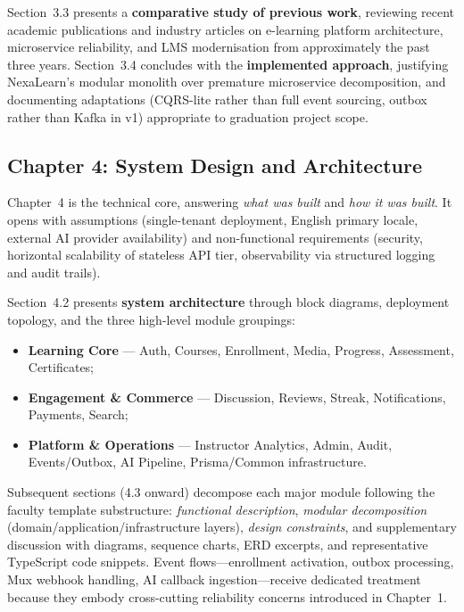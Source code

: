Section~3.3 presents a \textbf{comparative study of previous work}, reviewing recent academic publications and industry articles on e-learning platform architecture, microservice reliability, and LMS modernisation from approximately the past three years. Section~3.4 concludes with the \textbf{implemented approach}, justifying NexaLearn's modular monolith over premature microservice decomposition, and documenting adaptations (CQRS-lite rather than full event sourcing, outbox rather than Kafka in v1) appropriate to graduation project scope.

\subsection{Chapter 4: System Design and Architecture}
\label{subsec:doc-ch4}

Chapter~4 is the technical core, answering \textit{what was built} and \textit{how it was built}. It opens with assumptions (single-tenant deployment, English primary locale, external AI provider availability) and non-functional requirements (security, horizontal scalability of stateless API tier, observability via structured logging and audit trails).

Section~4.2 presents \textbf{system architecture} through block diagrams, deployment topology, and the three high-level module groupings:
\begin{itemize}
  \item \textbf{Learning Core} --- Auth, Courses, Enrollment, Media, Progress, Assessment, Certificates;
  \item \textbf{Engagement \& Commerce} --- Discussion, Reviews, Streak, Notifications, Payments, Search;
  \item \textbf{Platform \& Operations} --- Instructor Analytics, Admin, Audit, Events/Outbox, AI Pipeline, Prisma/Common infrastructure.
\end{itemize}

Subsequent sections (4.3 onward) decompose each major module following the faculty template substructure: \textit{functional description}, \textit{modular decomposition} (domain/application/infrastructure layers), \textit{design constraints}, and supplementary discussion with diagrams, sequence charts, ERD excerpts, and representative TypeScript code snippets. Event flows---enrollment activation, outbox processing, Mux webhook handling, AI callback ingestion---receive dedicated treatment because they embody cross-cutting reliability concerns introduced in Chapter~1.

